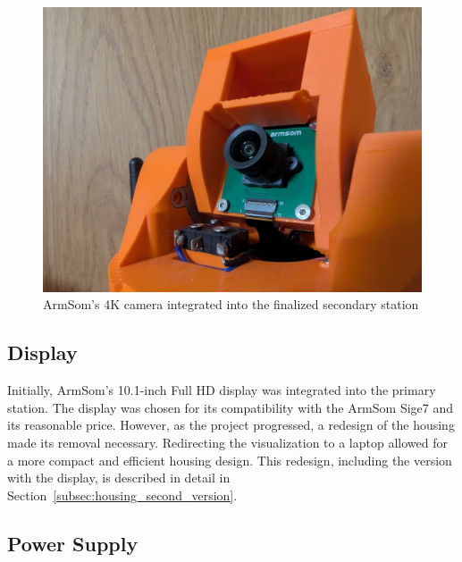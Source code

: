 \begin{figure}[H]
	\centering
	\includegraphics[width=1.0\linewidth]{figures/armsom_camera}
	\caption{ArmSom's 4K camera integrated into the finalized secondary station}
	\label{fig:armsomcamera}
\end{figure}

\subsection{Display}

Initially, ArmSom's 10.1-inch Full HD display \cite{armsom_display} was integrated into the primary station. The display was chosen for its compatibility with the ArmSom Sige7 \cite{armsom_sige7} and its reasonable price. However, as the project progressed, a redesign of the housing made its removal necessary. Redirecting the visualization to a laptop allowed for a more compact and efficient housing design. This redesign, including the version with the display, is described in detail in Section~\ref{subsec:housing_second_version}.

\subsection{Power Supply}

